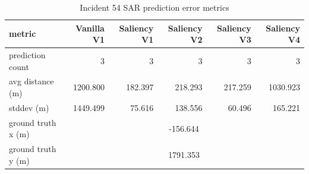 \begin{table}[ht]
\centering
\caption{Incident 54 SAR prediction error metrics}
\label{tab:sar-incident-54}
\begin{tabular}{lrrrrr}
\hline
metric & Vanilla V1 & Saliency V1 & Saliency V2 & Saliency V3 & Saliency V4 \\
\hline
prediction count & 3 & 3 & 3 & 3 & 3 \\
avg distance (m) & 1200.800 & 182.397 & 218.293 & 217.259 & 1030.923 \\
stddev (m) & 1449.499 & 75.616 & 138.556 & 60.496 & 165.221 \\
ground truth x (m) & \multicolumn{5}{c}{-156.644} \\
ground truth y (m) & \multicolumn{5}{c}{1791.353} \\
\hline
\end{tabular}
\end{table}
